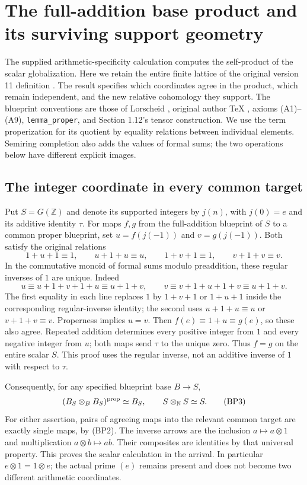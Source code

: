 \section{The full-addition base product and its surviving support geometry}
\label{sec:full-support-base-product}

The supplied arithmetic-specificity calculation computes the self-product
of the scalar globalization. Here we retain the entire finite lattice
of the original version 11 definition \cite{support}. The result specifies
which coordinates agree in the product, which remain independent, and
the new relative cohomology they support. The blueprint conventions are
those of Lorscheid \cite{lorscheid}, original author TeX
, axioms (A1)--(A9),
\texttt{lemma\_proper}, and Section 1.12's tensor construction.
We use the term properization for its quotient by equality relations
between individual elements. Semiring completion also adds the values
of formal sums; the two operations below have different explicit images.

\subsection{The integer coordinate in every common target}

Put $S=G(\mathbb Z)$ and denote its supported integers by $j(n)$,
with $j(0)=e$ and its additive identity $\tau$. For maps $f,g$ from
the full-addition blueprint of $S$ to a common proper blueprint, set
$u=f(j(-1))$ and $v=g(j(-1))$. Both satisfy the original relations
\[
 1+u+1\equiv1,\qquad u+1+u\equiv u,
 \qquad 1+v+1\equiv1,\qquad v+1+v\equiv v.
 \tag{BP1}
\]
In the commutative monoid of formal sums modulo preaddition,
these regular inverses of $1$ are unique. Indeed
\[
 u\equiv u+1+v+1+u\equiv u+1+v,
 \qquad v\equiv v+1+u+1+v\equiv u+1+v.
 \tag{BP2}
\]
The first equality in each line replaces $1$ by $1+v+1$ or
$1+u+1$ inside the corresponding regular-inverse identity;
the second uses $u+1+u\equiv u$ or $v+1+v\equiv v$.
Properness implies $u=v$. Then $f(e)\equiv1+u\equiv g(e)$,
so these also agree. Repeated addition determines every positive
integer from $1$ and every negative integer from $u$; both maps send
$\tau$ to the unique zero. Thus $f=g$ on the entire scalar $S$.
This proof uses the regular inverse, not an additive inverse of $1$
with respect to $\tau$.

Consequently, for any specified blueprint base $B\to S$,
\[
 (B_S\otimes_B B_S)^{\rm prop}\simeq B_S,
 \qquad S\otimes_{\mathbb N}S\simeq S.
 \tag{BP3}
\]
For either assertion, pairs of agreeing maps into the relevant common
target are exactly single maps, by (BP2). The inverse arrows are
the inclusion $a\mapsto a\otimes1$ and multiplication
$a\otimes b\mapsto ab$. Their composites are identities by that
universal property. This proves the scalar calculation in the arrival.
In particular $e\otimes1=1\otimes e$; the actual prime $(e)$ remains
present and does not become two different arithmetic coordinates.

